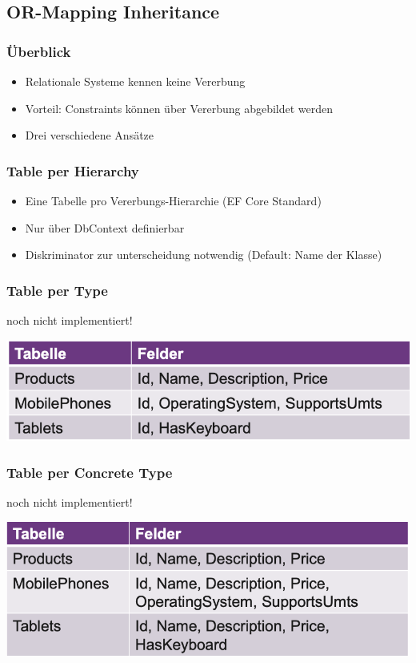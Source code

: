 \subsection{OR-Mapping Inheritance}
\subsubsection{Überblick}
\begin{itemize}
    \item Relationale Systeme kennen keine Vererbung
    \item Vorteil: Constraints können über Vererbung abgebildet werden
    \item Drei verschiedene Ansätze
\end{itemize}

\subsubsection{Table per Hierarchy}
\begin{itemize}
    \item Eine Tabelle pro Vererbungs-Hierarchie (EF Core Standard)
    \item Nur über DbContext definierbar
    \item Diskriminator zur unterscheidung notwendig (Default: Name der Klasse)
\end{itemize}

\subsubsection{Table per Type}
noch nicht implementiert!
\vspace{-8pt}
\begin{center}
    \includegraphics[scale=.32]{graphic/efc/Table per Type.png}
\end{center}
\vspace{-8pt}

\subsubsection{Table per Concrete Type}
noch nicht implementiert!
\vspace{-8pt}
\begin{center}
    \includegraphics[scale=.32]{graphic/efc/Table per Concrete Type.png}
\end{center}
\vspace{-8pt}


